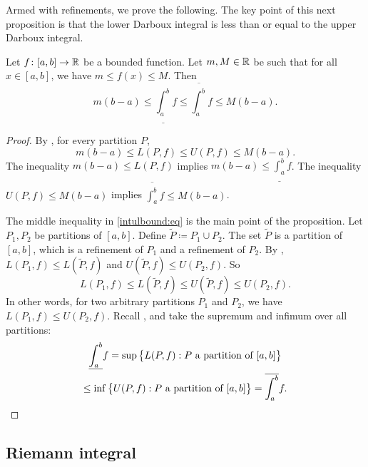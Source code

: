 Armed with refinements, we prove the following.
The key point of this next proposition is that
the lower Darboux integral is less than or equal to the upper Darboux
integral.

\begin{prop} \label{intulbound:prop}
Let $f \colon [a,b] \to {\mathbb{R}}$ be a bounded function.  Let $m, M \in {\mathbb{R}}$ be 
such that for all $x \in [a,b]$, we have $m \leq f(x) \leq M$.  Then
\begin{equation}
\label{intulbound:eq}
m(b-a) \leq
\underline{\int_a^b} f \leq \overline{\int_a^b} f
\leq M(b-a) .
\end{equation}
\end{prop}

\begin{proof}
By , for every partition $P$,
\begin{equation*}
m(b-a) \leq L(P,f) \leq U(P,f) \leq M(b-a).
\end{equation*}
The inequality
$m(b-a) \leq L(P,f)$ implies $m(b-a) \leq \underline{\int_a^b} f$.
The inequality
$U(P,f) \leq M(b-a)$ implies $\overline{\int_a^b} f \leq M(b-a)$.

The middle inequality in
\eqref{intulbound:eq} is the main point of the proposition.
Let $P_1, P_2$ be partitions of $[a,b]$.  Define 
$\widetilde{P} \coloneqq P_1 \cup P_2$.
The set $\widetilde{P}$ is a partition of $[a,b]$, which
is a refinement of $P_1$ and a refinement of $P_2$.
By ,
$L(P_1,f) \leq L(\widetilde{P},f)$ and
$U(\widetilde{P},f) \leq U(P_2,f)$.  So
\begin{equation*}
L(P_1,f) \leq L(\widetilde{P},f) \leq U(\widetilde{P},f) \leq U(P_2,f) .
\end{equation*}
In other words, for two arbitrary partitions $P_1$ and $P_2$, we have
$L(P_1,f) \leq U(P_2,f)$.  
Recall , and take the supremum and
infimum over all partitions:
\begin{multline*}
\underline{\int_a^b} f = 
\sup \, \bigl\{ L(P,f) : P \text{ a partition of } [a,b] \bigr\}
\\
\leq
\inf \, \bigl\{ U(P,f) : P \text{ a partition of } [a,b] \bigr\}
=
\overline{\int_a^b} f . \qedhere
\end{multline*}
\end{proof}

\subsection{Riemann integral}

